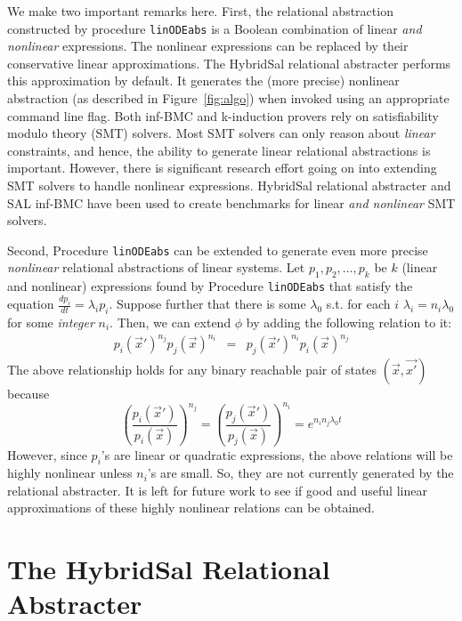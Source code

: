 \documentclass{llncs}
\def\linODEabs{\tt{linODEabs}}
\newcommand\ignore[1]{{}}
\begin{document}
We make two important remarks here.
First,
the relational abstraction constructed by 
procedure {\linODEabs} is a Boolean combination
of linear {\em{and nonlinear}} expressions.
The nonlinear expressions can be replaced by their
conservative linear approximations.  The
HybridSal relational abstracter performs this approximation
by default.  It generates the (more precise)
nonlinear abstraction (as described in Figure~\ref{fig:algo})
when invoked using an appropriate command line flag.
Both inf-BMC and k-induction
provers rely on satisfiability modulo theory (SMT) solvers.
Most SMT solvers can only reason %
about {\em{linear}} constraints, and hence, the ability to
generate linear relational abstractions is important.
However, there is significant research effort going on
into extending SMT solvers to handle nonlinear expressions.
HybridSal relational abstracter and SAL inf-BMC 
have been used to create benchmarks for 
linear {\em{and nonlinear}} SMT solvers.

Second, Procedure {\linODEabs} can be extended to
generate even more precise {\em{nonlinear}}
relational abstractions of linear systems.
Let $p_1, p_2, \ldots, p_k$ be $k$ (linear and nonlinear)
expressions found by Procedure {\linODEabs} that 
satisfy the equation $\frac{dp_i}{dt} = \lambda_i p_i$.
Suppose further that 
there is some $\lambda_0$ s.t.
for each $i$
$\lambda_i = n_i \lambda_0$ for some {\em{integer}} $n_i$.
Then, we can extend $\phi$ by adding the following relation to it:
\begin{eqnarray}
 p_i(\vec{x}')^{n_j} p_j(\vec{x})^{n_i}
 & = & p_j(\vec{x}')^{n_i}  p_i(\vec{x})^{n_j}
\label{eqn:nl}
\end{eqnarray}
The above relationship holds for any binary reachable
pair of states $(\vec{x},\vec{x'})$ 
because
$$
 \left(\frac{p_i(\vec{x}')}{p_i(\vec{x})}\right)^{n_j} 
 = 
 \left(\frac{p_j(\vec{x}')}{p_j(\vec{x})}\right)^{n_i} 
 =
 e^{n_in_j\lambda_0 t}
$$
However, since $p_i$'s are linear or quadratic 
expressions, the above relations will be highly
nonlinear unless $n_i$'s are small.  So, they are
not currently generated by the relational abstracter.
It is left for future work to see if good and useful
linear approximations of these highly nonlinear relations
can be obtained.

\section{The HybridSal Relational Abstracter}
\end{document}
